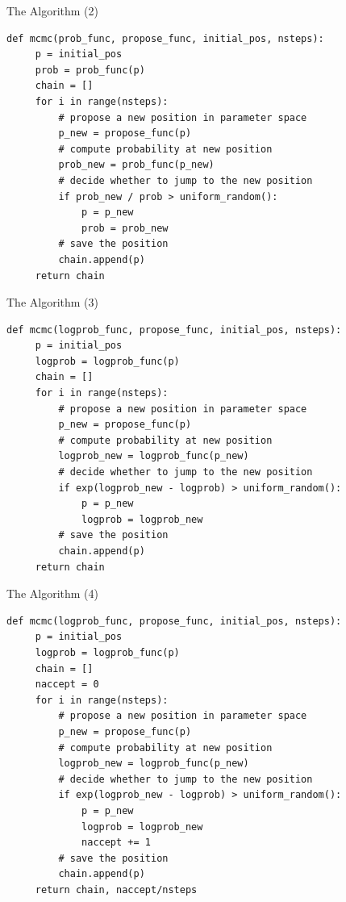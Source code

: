 \documentclass{beamer}
\begin{document}
\begin{frame}[fragile]{The Algorithm (2)}
\begin{small}
\begin{verbatim}
def mcmc(prob_func, propose_func, initial_pos, nsteps):
     p = initial_pos
     prob = prob_func(p)
     chain = []
     for i in range(nsteps):
         # propose a new position in parameter space
         p_new = propose_func(p)
         # compute probability at new position
         prob_new = prob_func(p_new)
         # decide whether to jump to the new position
         if prob_new / prob > uniform_random():
             p = p_new
             prob = prob_new
         # save the position
         chain.append(p)
     return chain
\end{verbatim}
\end{small}
\end{frame}

\begin{frame}[fragile]{The Algorithm (3)}
\begin{small}
\begin{verbatim}
def mcmc(logprob_func, propose_func, initial_pos, nsteps):
     p = initial_pos
     logprob = logprob_func(p)
     chain = []
     for i in range(nsteps):
         # propose a new position in parameter space
         p_new = propose_func(p)
         # compute probability at new position
         logprob_new = logprob_func(p_new)
         # decide whether to jump to the new position
         if exp(logprob_new - logprob) > uniform_random():
             p = p_new
             logprob = logprob_new
         # save the position
         chain.append(p)
     return chain
\end{verbatim}
\end{small}
\end{frame}

\begin{frame}[fragile]{The Algorithm (4)}
\begin{small}
\begin{verbatim}
def mcmc(logprob_func, propose_func, initial_pos, nsteps):
     p = initial_pos
     logprob = logprob_func(p)
     chain = []
     naccept = 0
     for i in range(nsteps):
         # propose a new position in parameter space
         p_new = propose_func(p)
         # compute probability at new position
         logprob_new = logprob_func(p_new)
         # decide whether to jump to the new position
         if exp(logprob_new - logprob) > uniform_random():
             p = p_new
             logprob = logprob_new
             naccept += 1
         # save the position
         chain.append(p)
     return chain, naccept/nsteps
\end{verbatim}
\end{small}
\end{frame}
\end{document}
